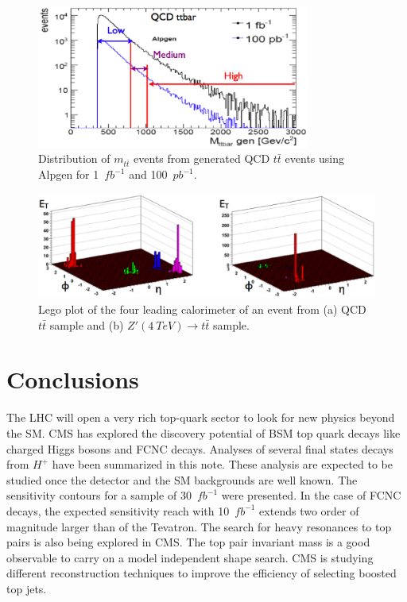 \documentclass{cimento}
\begin{document}
\begin{figure}
\centering
\includegraphics[width=0.8\textwidth]{fig05.ps}
\caption{Distribution of $m_{t\bar{t}}$ events from generated QCD $t\bar{t}$ events using Alpgen for
1~$fb^{-1}$ and 100~$pb^{-1}$.}
\label{fig:fig5}
\end{figure}

\begin{figure}
\centering
\includegraphics[width=1.1\textwidth]{fig07.ps}
\caption{Lego plot of the four leading calorimeter of an event from (a) QCD $t\bar{t}$ sample and (b) $Z'(4~TeV)\rightarrow t\bar{t}$ sample.}
\label{fig:fig7}
\end{figure}

\section{Conclusions}
\label{sec:Conclusions}

The LHC will open a very rich top-quark sector to look for new physics beyond the SM.
CMS has explored the discovery potential of BSM top quark decays like charged Higgs
bosons and FCNC decays. Analyses of several final states decays from $H^{+}$ have
been summarized in this note. These analysis are expected to be studied once the
detector and the SM backgrounds are well known. The sensitivity contours for a sample
of 30~$fb^{-1}$ were presented. In the case of FCNC decays, the expected sensitivity
reach with 10~$fb^{-1}$ extends two order of magnitude larger than of the Tevatron.
The search for heavy resonances to top pairs is also being explored in CMS. The
top pair invariant mass is a good observable to carry on a model independent shape
search. CMS is studying different reconstruction techniques to improve the efficiency
of selecting boosted top jets.
\end{document}
